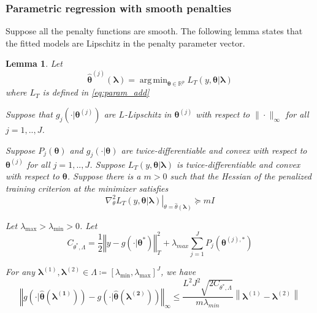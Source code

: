 \documentclass[12pt]{article}
\newtheorem{lemma}{Lemma}
\DeclareMathOperator*{\argmin}{arg\,min}
\begin{document}
\subsubsection{Parametric regression with smooth penalties}
Suppose all the penalty functions are smooth. The following lemma states that the fitted models are Lipschitz in the penalty parameter vector.
\begin{lemma}
	\label{lemma:param_add}
	Let 
	\begin{equation}
	\label{eq:param_add_estimator}
	\hat{\boldsymbol{\theta}}^{(j)}\left (\boldsymbol{\lambda}\right )  = 
	\argmin_{\boldsymbol{\theta} \in \mathbb{R}^p} L_T \left (y, \boldsymbol{\theta} | \boldsymbol{\lambda} \right )
	\end{equation}
	where $L_T$ is defined in \eqref{eq:param_add}
	
	Suppose that $g_j(\cdot| \boldsymbol{\theta}^{(j)})$ are $L$-Lipschitz in $\boldsymbol{\theta}^{(j)}$ with respect to $\| \cdot \|_\infty$ for all $j=1,..,J$.
	
	Suppose $P_j(\boldsymbol{\theta})$ and $g_j(\cdot| \boldsymbol{\theta})$ are twice-differentiable and convex with respect to $\boldsymbol{\theta}^{(j)}$ for all $j=1,..,J$. Suppose $L_T\left (y, \boldsymbol{\theta} | \boldsymbol{\lambda} \right )$ is twice-differentiable and convex with respect to $\boldsymbol{\theta}$. Suppose there is a $m > 0$ such that the Hessian of the penalized training criterion at the minimizer satisfies 
	\begin{equation}
	\left . \nabla_{\theta}^2 L_T(y, \boldsymbol{\theta} | \boldsymbol{\lambda}) \right |_{\theta = \hat{\theta}(\boldsymbol{\lambda})} \succeq mI
	\end{equation}
	
	Let $\lambda_{\max} > \lambda_{\min} > 0 $. Let
	\begin{equation}
	C_{\theta^{*},\Lambda}=
	\frac{1}{2}\left\Vert y- g(\cdot|\boldsymbol{\theta}^{*})\right\Vert _{T}^{2}
	+\lambda_{max}\sum_{j=1}^{J} P_{j}(\boldsymbol{\theta}^{(j),*})
	\end{equation}
	
	For any $\boldsymbol{\lambda}^{(1)}, \boldsymbol{\lambda}^{(2)} \in \Lambda \coloneqq \left [ \lambda_{\min}, \lambda_{\max} \right ]^J$, we have
	\begin{equation}
	\label{eq:param_add_lipschitz}
	\left\Vert g\left(\cdot|\hat{\boldsymbol{\theta}}(\boldsymbol{\lambda^{(1)}})\right)-g\left(\cdot|\hat{\boldsymbol{\theta}}(\boldsymbol{\lambda^{(2)}})\right)\right\Vert _{\infty}
	\le
	\frac{L^{2}J^{2}\sqrt{2C_{\theta^{*},\Lambda}}}{m \lambda_{min}}
	\left \|\boldsymbol{\lambda}^{(1)}-\boldsymbol{\lambda}^{(2)} \right \|
	\end{equation}
\end{lemma}
\end{document}
